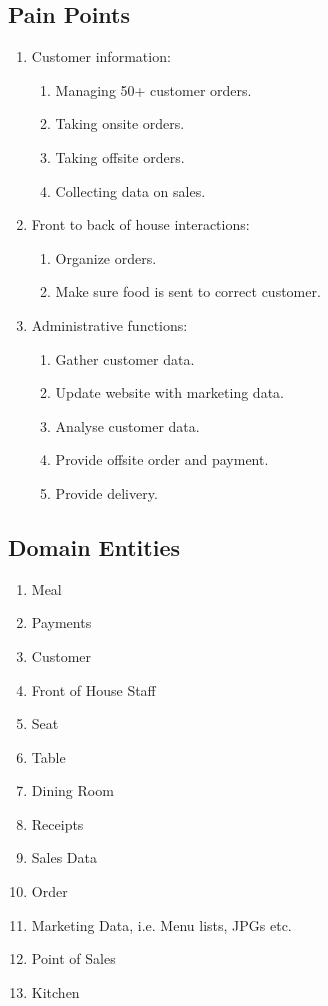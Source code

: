 \documentclass{article}
\begin{document}
\subsection{Pain Points}
\begin{enumerate}
    \item Customer information:
    \begin{enumerate}
        \item Managing 50+ customer orders.
        \item Taking onsite orders.
        \item Taking offsite orders.
        \item Collecting data on sales.
        \end{enumerate}
    \item Front to back of house interactions:
    \begin{enumerate}
        \item Organize orders.
        \item Make sure food is sent to correct customer.
    \end{enumerate}
    \item Administrative functions:
    \begin{enumerate}
        \item Gather customer data.
        \item Update website with marketing data.
        \item Analyse customer data.
        \item Provide offsite order and payment.
        \item Provide delivery.
    \end{enumerate}
\end{enumerate}


\subsection{Domain Entities}
\begin{enumerate}
    \item Meal
    \item Payments
    \item Customer
    \item Front of House Staff
    \item Seat
    \item Table
    \item Dining Room
    \item Receipts
    \item Sales Data
    \item Order
    \item Marketing Data, i.e. Menu lists, JPGs etc.
    \item Point of Sales
    \item Kitchen
\end{enumerate}
\end{document}
